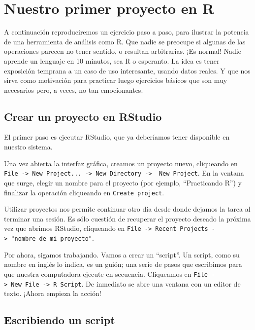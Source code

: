 \documentclass[]{book}
\begin{document}
\section{Nuestro primer proyecto en
R}\label{nuestro-primer-proyecto-en-r}

A continuación reproduciremos un ejercicio paso a paso, para ilustrar la
potencia de una herramienta de análisis como R. Que nadie se preocupe si
algunas de las operaciones parecen no tener sentido, o resultan
arbitrarias. ¡Es normal! Nadie aprende un lenguaje en 10 minutos, sea R
o esperanto. La idea es tener exposición temprana a un caso de uso
interesante, usando datos reales. Y que nos sirva como motivación para
practicar luego ejercicios básicos que son muy necesarios pero, a veces,
no tan emocionantes.

\subsection{Crear un proyecto en
RStudio}\label{crear-un-proyecto-en-rstudio}

El primer paso es ejecutar RStudio, que ya deberíamos tener disponible
en nuestro sistema.

Una vez abierta la interfaz gráfica, creamos un proyecto nuevo,
cliqueando en
\texttt{File\ -\textgreater{}\ New\ Project...\ -\textgreater{}\ New\ Directory\ -\textgreater{}\ \ New\ Project}.
En la ventana que surge, elegir un nombre para el proyecto (por ejemplo,
``Practicando R'') y finalizar la operación cliqueando en
\texttt{Create\ project}.

Utilizar proyectos nos permite continuar otro día desde donde dejamos la
tarea al terminar una sesión. Es sólo cuestión de recuperar el proyecto
deseado la próxima vez que abrimos RStudio, cliqueando en
\texttt{File\ -\textgreater{}\ Recent\ Projects\ -\textgreater{}\ "nombre\ de\ mi\ proyecto"}.

Por ahora, sigamos trabajando. Vamos a crear un ``script''. Un script,
como su nombre en inglés lo indica, es un guión; una serie de pasos que
escribimos para que nuestra computadora ejecute en secuencia. Cliqueamos
en
\texttt{File\ -\textgreater{}\ New\ File\ -\textgreater{}\ R\ Script}.
De inmediato se abre una ventana con un editor de texto. ¡Ahora empieza
la acción!

\subsection{Escribiendo un script}\label{escribiendo-un-script}
\end{document}
